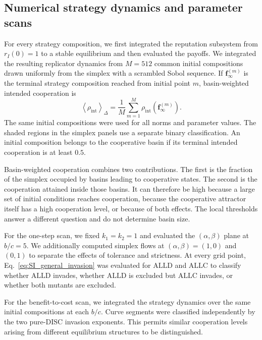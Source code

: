 \documentclass[fleqn,10pt]{wlscirep}
\begin{document}
\subsection{Numerical strategy dynamics and parameter scans}

For every strategy composition, we first integrated the reputation subsystem from $r_I(0)=1$ to a stable equilibrium and then evaluated the payoffs. We integrated the resulting replicator dynamics from $M=512$ common initial compositions drawn uniformly from the simplex with a scrambled Sobol sequence. If $\boldsymbol f_\infty^{(m)}$ is the terminal strategy composition reached from initial point $m$, basin-weighted intended cooperation is
\begin{equation}
\left\langle\rho_{\mathrm{int}}\right\rangle_{\Delta}
=\frac{1}{M}\sum_{m=1}^{M}\rho_{\mathrm{int}}\!\left(\boldsymbol f_\infty^{(m)}\right).
\label{eq:si-basin-weighted-cooperation}
\end{equation}
The same initial compositions were used for all norms and parameter values. The shaded regions in the simplex panels use a separate binary classification. An initial composition belongs to the cooperative basin if its terminal intended cooperation is at least $0.5$.

Basin-weighted cooperation combines two contributions. The first is the fraction of the simplex occupied by basins leading to cooperative states. The second is the cooperation attained inside those basins. It can therefore be high because a large set of initial conditions reaches cooperation, because the cooperative attractor itself has a high cooperation level, or because of both effects. The local thresholds answer a different question and do not determine basin size.

For the one-step scan, we fixed $k_1=k_2=1$ and evaluated the $(\alpha,\beta)$ plane at $b/c=5$. We additionally computed simplex flows at $(\alpha,\beta)=(1,0)$ and $(0,1)$ to separate the effects of tolerance and strictness. At every grid point, Eq.~\eqref{eq:SI_general_invasion} was evaluated for $\mathrm{ALLD}$ and $\mathrm{ALLC}$ to classify whether $\mathrm{ALLD}$ invades, whether $\mathrm{ALLD}$ is excluded but $\mathrm{ALLC}$ invades, or whether both mutants are excluded.

For the benefit-to-cost scan, we integrated the strategy dynamics over the same initial compositions at each $b/c$. Curve segments were classified independently by the two pure-$\mathrm{DISC}$ invasion exponents. This permits similar cooperation levels arising from different equilibrium structures to be distinguished.
\end{document}
